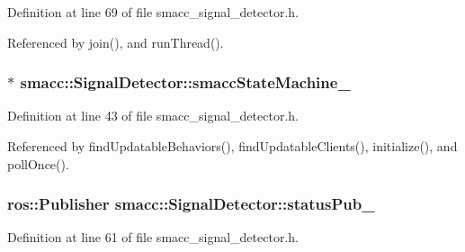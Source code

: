 Definition at line 69 of file smacc\+\_\+signal\+\_\+detector.\+h.



Referenced by join(), and run\+Thread().

\subsubsection[{\texorpdfstring{smacc\+State\+Machine\+\_\+}{smaccStateMachine_}}]{$\ast$ smacc\+::\+Signal\+Detector\+::smacc\+State\+Machine\+\_\+\hspace{0.3cm}{\ttfamily [private]}}\hypertarget{classsmacc_1_1SignalDetector_a46025de6ac7b5980e22144f9703236a4}{}\label{classsmacc_1_1SignalDetector_a46025de6ac7b5980e22144f9703236a4}


Definition at line 43 of file smacc\+\_\+signal\+\_\+detector.\+h.



Referenced by find\+Updatable\+Behaviors(), find\+Updatable\+Clients(), initialize(), and poll\+Once().

\subsubsection[{\texorpdfstring{status\+Pub\+\_\+}{statusPub_}}]{\setlength{\rightskip}{0pt plus 5cm}ros\+::\+Publisher smacc\+::\+Signal\+Detector\+::status\+Pub\+\_\+\hspace{0.3cm}{\ttfamily [private]}}\hypertarget{classsmacc_1_1SignalDetector_ae065bbd4e699e5fce00fbc508dedd4c1}{}\label{classsmacc_1_1SignalDetector_ae065bbd4e699e5fce00fbc508dedd4c1}


Definition at line 61 of file smacc\+\_\+signal\+\_\+detector.\+h.


